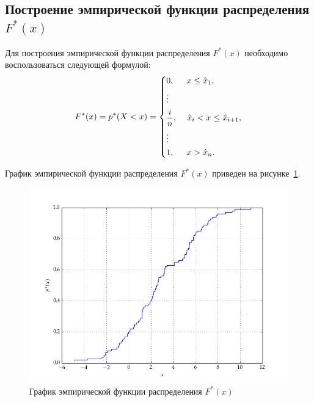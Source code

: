 \documentclass[14pt,hidelinks]{extarticle}
\begin{document}
\subsection{Построение эмпирической функции распределения $F^*(x)$}
Для построения эмпирической функции распределения $F^*(x)$ необходимо воспользоваться следующей формулой:
\begin{equation}
	\begin{aligned}
		F^*(x)=p^*(X<x)=
		\left\{
			\begin{aligned}
				&0, \hspace{5mm} x \le \hat{x}_1, \\
				&\vdots \\
				&\frac{i}{n}, \hspace{4mm} \hat{x}_i < x \le \hat{x}_{i+1}, \\
				&\vdots \\
				&1, \hspace{5mm} x > \hat{x}_n.
			\end{aligned}
		\right.
	\end{aligned}
\end{equation}

График эмпирической функции распределения $F^*(x)$ приведен на рисунке~\ref{fig:emp_distrib}.
\begin{figure}[h!] 

  \centering
  \includegraphics[width=1\linewidth]{pic/sample.png}
  \caption{График эмпирической функции распределения $F^*(x)$\label{fig:emp_distrib}}
\end{figure}

\newpage
\end{document}
